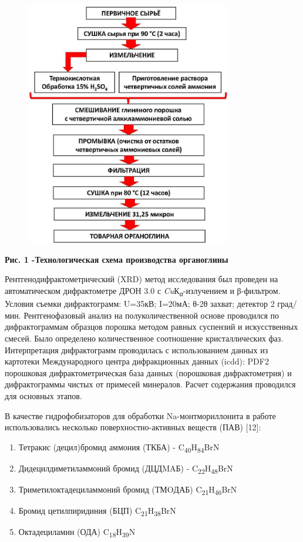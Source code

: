 \begin{figure}[H]
	\centering
	\includegraphics[width=0.8\textwidth]{assets/1014}
	\caption*{}
\end{figure}

\textbf{Рис. 1 -Технологическая схема производства органоглины}

Рентгенодифрактометрический (XRD) метод исследования был проведен на
автоматическом дифрактометре ДРОН 3.0 с
\emph{Cu}К\emph{\textsubscript{α}}-излучением и β-фильтром. Условия
съемки дифрактограмм: U=35кВ; I=20мА; θ-2θ захват; детектор 2 град/мин.
Рентгенофазовый анализ на полуколичественной основе проводился по
дифрактограммам образцов порошка методом равных суспензий и
искусственных смесей. Было определено количественное соотношение
кристаллических фаз. Интерпретация дифрактограмм проводилась с
использованием данных из картотеки Международного центра дифракционных
данных (icdd): PDF2 порошковая дифрактометрическая база данных
(порошковая дифрактометрия) и дифрактограммы чистых от примесей
минералов. Расчет содержания проводился для основных этапов.

В качестве гидрофобизаторов для обработки Na-монтмориллонита в работе
использовались несколько поверхностно-активных веществ (ПАВ) {[}12{]}:

\begin{enumerate}
\def\labelenumi{\arabic{enumi})}
\item
  Тетракис (децил)бромид аммония (ТКБА) -
  C\textsubscript{40}H\textsubscript{84}BrN
\item
  Дидецилдиметиламмоний бромид (ДЦДMAБ) -
  C\textsubscript{22}H\textsubscript{48}BrN
\item
  Триметилоктадециламмоний бромид (ТМOДАБ)
  C\textsubscript{21}H\textsubscript{46}BrN
\item
  Бромид цетилпиридиния (БЦП) C\textsubscript{21}H\textsubscript{38}BrN
\item
  Октадециламин (ОДА) C\textsubscript{18}H\textsubscript{39}N
\end{enumerate}

